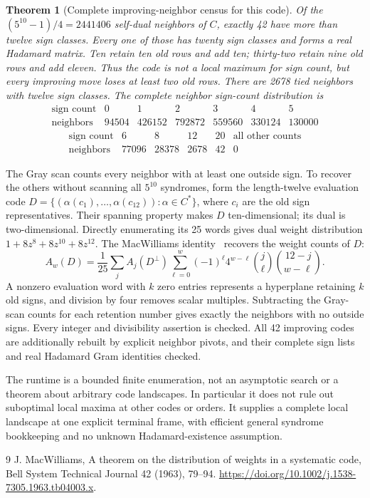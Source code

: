 \documentclass[11pt]{article}
\newtheorem{theorem}{Theorem}
\begin{document}
\begin{theorem}[Complete improving-neighbor census for this code]
Of the $(5^{10}-1)/4=2441406$ self-dual neighbors of $C$, exactly
42 have more than twelve sign classes. Every one of those has
twenty sign classes and forms a real Hadamard matrix. Ten retain
ten old rows and add ten; thirty-two retain nine old rows and add
eleven. Thus the code is not a local maximum for sign count, but
every improving move loses at least two old rows.
There are 2678 tied neighbors with twelve sign classes.
The complete neighbor sign-count distribution is
\[
\begin{array}{c|rrrrrr}
\text{sign count}&0&1&2&3&4&5\\\hline
\text{neighbors}&94504&426152&792872&559560&330124&130000
\end{array}
\]
\[
\begin{array}{c|rrrrr}
\text{sign count}&6&8&12&20&\text{all other counts}\\\hline
\text{neighbors}&77096&28378&2678&42&0
\end{array}
\]
\end{theorem}

The Gray scan counts every neighbor with at least one outside sign.
To recover the others without scanning all $5^{10}$ syndromes, form
the length-twelve evaluation code
$D=\{(\alpha(c_1),\ldots,\alpha(c_{12})): \alpha\in C^*\}$,
where $c_i$ are the old sign representatives. Their spanning property
makes $D$ ten-dimensional; its dual is two-dimensional. Directly
enumerating its 25 words gives dual weight distribution
$1+8z^8+8z^{10}+8z^{12}$.
The MacWilliams identity~\cite{MW} recovers the weight counts of $D$:
\[
 A_w(D)=\frac1{25}\sum_j A_j(D^\perp)
 \sum_{\ell=0}^w(-1)^\ell4^{w-\ell}
       \binom j\ell\binom{12-j}{w-\ell}.
\]
A nonzero evaluation word with $k$ zero entries represents a
hyperplane retaining $k$ old signs, and division by four removes
scalar multiples. Subtracting the Gray-scan counts for each retention
number gives exactly the neighbors with no outside signs. Every
integer and divisibility assertion is checked. All 42 improving
codes are additionally rebuilt by explicit neighbor pivots, and
their complete sign lists and real Hadamard Gram identities checked.

The runtime is a bounded finite enumeration, not an asymptotic search
or a theorem about arbitrary code landscapes. In particular it does
not rule out suboptimal local maxima at other codes or orders.
It supplies a complete local landscape at one explicit terminal
frame, with efficient general syndrome bookkeeping and no unknown
Hadamard-existence assumption.
\begin{thebibliography}{9}
 J. MacWilliams, A theorem on the distribution of weights
in a systematic code, Bell System Technical Journal 42 (1963),
79--94. \url{https://doi.org/10.1002/j.1538-7305.1963.tb04003.x}.
\end{thebibliography}
\end{document}

